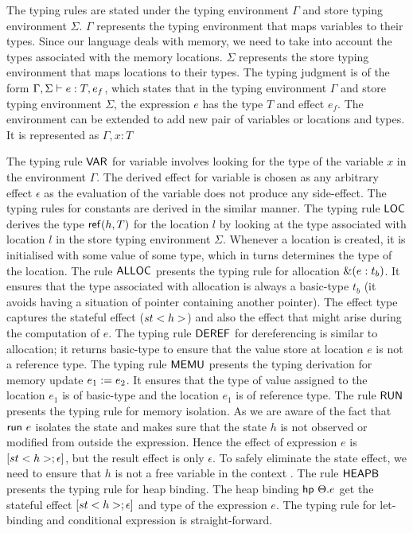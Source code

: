 

The typing rules are stated under the typing environment $\Gamma$ and store typing environment $\Sigma$. $\Gamma$ represents the typing environment that maps variables to their types. Since our language deals with memory, we need to take into account the types associated with the memory locations. $\Sigma$ represents the store typing environment that maps locations to their types. The typing judgment is of the form $\Gamma,\Sigma \vdash e : T, e_f$, which states that in the typing environment $\Gamma$ and store typing environment $\Sigma$, the expression $e$ has the type $T$ and effect $e_f$. The environment can be extended to add new pair of variables or locations and types. It is represented as $\Gamma, x : T$

The typing rule ${\mathsf{VAR}}$ for variable involves looking for the type of the variable $x$ in the environment $\Gamma$. The derived effect for variable is chosen as any arbitrary effect $\epsilon$ as the evaluation of the variable does not produce any side-effect. The typing rules for constants are derived in the similar manner. The typing rule ${\mathsf{LOC}}$ derives the type ${\mathsf{ref}}(h, T)$ for the location $l$ by looking at the type associated with location $l$ in the store typing environment $\Sigma$. Whenever a location is created, it is initialised with some value of some type, which in turns determines the type of the location. The rule ${\mathsf{ALLOC}}$ presents the typing rule for allocation $\&{(e : t_b)}$. It ensures that the type associated with allocation is always a basic-type $t_b$ (it avoids having a situation of pointer containing another pointer). The effect type captures the stateful effect ($st<h>$) and also the effect that might arise during the computation of $e$. The typing rule ${\mathsf{DEREF}}$ for dereferencing is similar to allocation; it returns basic-type to ensure that the value store at location $e$ is not a reference type. The typing rule ${\mathsf{MEMU}}$ presents the typing derivation for memory update $e_1 :=e_2$. It ensures that the type of value assigned to the location $e_1$ is of basic-type and the location $e_1$ is of reference type. The rule ${\mathsf{RUN}}$ presents the typing rule for memory isolation. As we are aware of the fact that ${\mathsf{run}}\ {e}$ isolates the state and makes sure that the state $h$ is not observed or modified from outside the expression. Hence the effect of expression $e$ is ${[st<h>; \epsilon]}$, but the result effect is only $\epsilon$. To safely eliminate the state effect, we need to ensure that $h$ is not a free variable in the context . The rule ${\mathsf{HEAPB}}$ presents the typing rule for heap binding. The heap binding ${{\mathsf{hp}}\ {\Theta}.{e}}$ get the stateful effect $[st<h>; \epsilon]$ and type of the expression $e$. The typing rule for let-binding and conditional expression is straight-forward.


